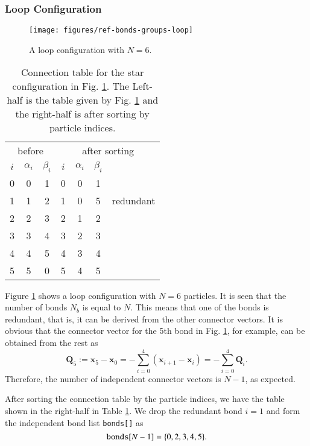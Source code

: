 \subsubsection{Loop Configuration}
\begin{figure}
  \centering
  \texttt{[image: figures/ref-bonds-groups-loop]}
  \caption{
    A loop configuration with $N=6$.
  }
  \label{fig:ref-bonds-groups-loop}
\end{figure}
\begin{table}[!htb]
  \begin{tabular}{ccc|cccc}
    \multicolumn{3}{c|}{before} &
    \multicolumn{4}{c}{after sorting} \\
    $i$ & $\alpha_{i}$ & $\beta_{i}$ & 
    $i$ & $\alpha_{i}$ & $\beta_{i}$ & \\
    \hline
    0 & 0 & 1 & 0 & 0 & 1 & \\
    1 & 1 & 2 & 1 & 0 & 5 & redundant\\
    2 & 2 & 3 & 2 & 1 & 2 & \\
    3 & 3 & 4 & 3 & 2 & 3 & \\
    4 & 4 & 5 & 4 & 3 & 4 & \\
    5 & 5 & 0 & 5 & 4 & 5 & 
  \end{tabular}
  \caption{%
    Connection table for the star configuration 
    in Fig. \ref{fig:ref-bonds-groups-loop}.
    The Left-half is the table given by Fig. \ref{fig:ref-bonds-groups-loop} 
    and the right-half is after sorting by particle indices. 
  }
  \label{tab:ref-bonds-groups-loop}
\end{table}
Figure \ref{fig:ref-bonds-groups-loop} shows a loop configuration with $N=6$ particles. 
It is seen that the number of bonds $N_{b}$ is equal to $N$. 
This means that one of the bonds is redundant, that is, 
it can be derived from the other connector vectors. 
It is obvious that the connector vector for the 5th bond 
in Fig. \ref{fig:ref-bonds-groups-loop}, for example, can be obtained from the rest as 
\begin{equation}
  \bm{Q}_{5}
  :=
  \bm{x}_{5} - \bm{x}_{0}
  =
  -\sum_{i=0}^{4}\left(\bm{x}_{i+1} - \bm{x}_{i}\right)
  =
  -\sum_{i=0}^{4}\bm{Q}_{i}
  .
  \label{eq:ref-bonds-groups-redundant-connector-for-loop}
\end{equation}
Therefore, the number of independent connector vectors is $N-1$, as expected.

After sorting the connection table by the particle indices, 
we have the table shown in the right-half in Table \ref{tab:ref-bonds-groups-loop}. 
We drop the redundant bond $i=1$ and form the independent 
bond list {\tt bonds[]} as 
\begin{equation}
  {\tt bonds}[N-1] = \{0, 2, 3, 4, 5\}.
\end{equation}



